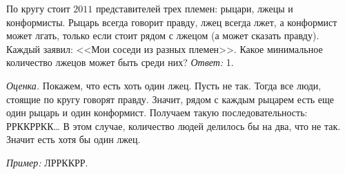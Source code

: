 \problem
По кругу стоит $2011$ представителей трех племен: рыцари, лжецы и конформисты.
Рыцарь всегда говорит правду, лжец всегда лжет, а конформист может лгать,
только если стоит рядом с лжецом (а может сказать правду).
Каждый заявил: <<Мои соседи из разных племен>>.
Какое минимальное количество лжецов может быть среди них?
\solution
\emph{Ответ:} 1.
\par
\emph{Оценка.}
Покажем, что есть хоть один лжец.
Пусть не так.
Тогда все люди, стоящие по кругу говорят правду.
Значит, рядом с каждым рыцарем есть еще один рыцарь и один конформист.
Получаем такую последовательность: РРККРРКК\ldots
В этом случае, количество людей делилось бы на два, что не так.
Значит есть хотя бы один лжец.
\par
\emph{Пример:} ЛРРККРР.
\endproblem
